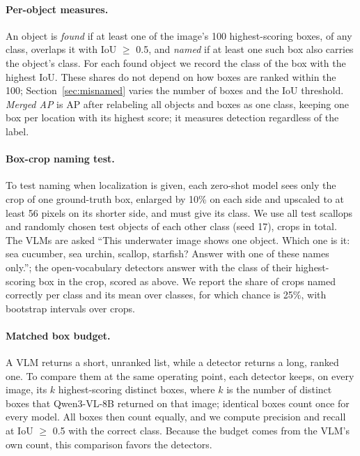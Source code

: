 \documentclass[letterpaper]{article} %
\begin{document}
\paragraph{Per-object measures.}
An object is \emph{found} if at least one of the image's 100 highest-scoring boxes, of any class, overlaps it with IoU $\geq$ 0.5, and \emph{named} if at least one such box also carries the object's class. For each found object we record the class of the box with the highest IoU. These shares do not depend on how boxes are ranked within the 100; Section~\ref{sec:misnamed} varies the number of boxes and the IoU threshold. \emph{Merged AP} is AP after relabeling all objects and boxes as one class, keeping one box per location with its highest score; it measures detection regardless of the label.

\paragraph{Box-crop naming test.}
To test naming when localization is given, each zero-shot model sees only the crop of one ground-truth box, enlarged by 10\% on each side and upscaled to at least 56 pixels on its shorter side, and must give its class. We use all \nCropsScallop{} test scallops and \nCropsOther{} randomly chosen test objects of each other class (seed 17), \nCrops{} crops in total. The VLMs are asked ``This underwater image shows one object. Which one is it: sea cucumber, sea urchin, scallop, starfish? Answer with one of these names only.''; the open-vocabulary detectors answer with the class of their highest-scoring box in the crop, scored as above. We report the share of crops named correctly per class and its mean over classes, for which chance is 25\%, with bootstrap intervals over crops.

\paragraph{Matched box budget.}
A VLM returns a short, unranked list, while a detector returns a long, ranked one. To compare them at the same operating point, each detector keeps, on every image, its $k$ highest-scoring distinct boxes, where $k$ is the number of distinct boxes that Qwen3-VL-8B returned on that image; identical boxes count once for every model. All boxes then count equally, and we compute precision and recall at IoU $\geq$ 0.5 with the correct class. Because the budget comes from the VLM's own count, this comparison favors the detectors.
\end{document}

